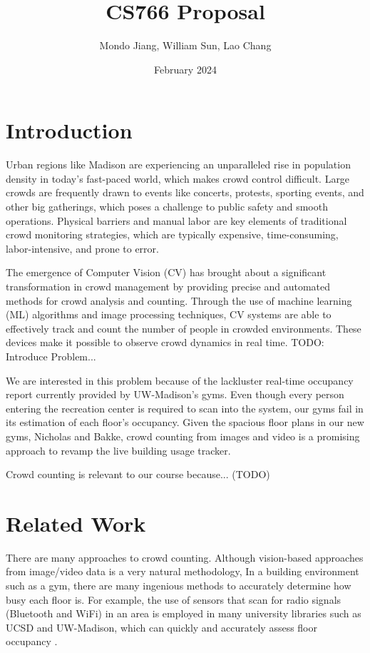 \documentclass{article}
\title{CS766 Proposal}
\author{Mondo Jiang, William Sun, Lao Chang}
\date{February 2024}
\begin{document}
\maketitle

\section{Introduction}
Urban regions like Madison are experiencing an unparalleled rise in population density in today's fast-paced world, which makes crowd control difficult. Large crowds are frequently drawn to events like concerts, protests, sporting events, and other big gatherings, which poses a challenge to public safety and smooth operations. Physical barriers and manual labor are key elements of traditional crowd monitoring strategies, which are typically expensive, time-consuming, labor-intensive, and prone to error.

The emergence of Computer Vision (CV) has brought about a significant transformation in crowd management by providing precise and automated methods for crowd analysis and counting. Through the use of machine learning (ML) algorithms and image processing techniques, CV systems are able to effectively track and count the number of people in crowded environments. These devices make it possible to observe crowd dynamics in real time.
\newline
TODO: Introduce Problem...

We are interested in this problem because of the lackluster real-time occupancy report currently provided by UW-Madison's gyms. Even though every person entering the recreation center is required to scan into the system, our gyms fail in its estimation of each floor's occupancy. Given the spacious floor plans in our new gyms, Nicholas and Bakke, crowd counting from images and video is a promising approach to revamp the live building usage tracker.

Crowd counting is relevant to our course because... (TODO)

\section{Related Work}
There are many approaches to crowd counting. Although vision-based approaches from image/video data is a very natural methodology, In a building environment such as a gym, there are many ingenious methods to accurately determine how busy each floor is. For example, the use of sensors that scan for radio signals (Bluetooth and WiFi) in an area is employed in many university libraries such as UCSD and UW-Madison, which can quickly and accurately assess floor occupancy \cite{waitz}.
\end{document}
